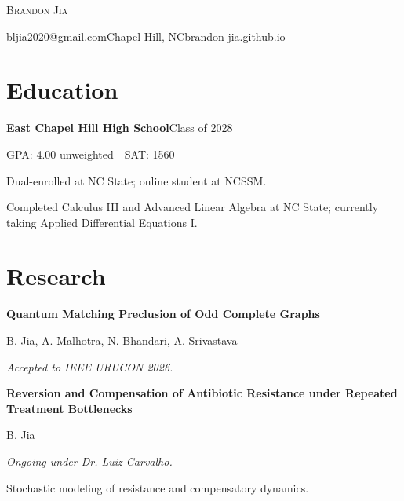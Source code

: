 \documentclass[10pt,letterpaper]{article}
\begin{document}
{\LARGE\scshape Brandon Jia}\par
\vspace{2pt}
\href{mailto:bljia2020@gmail.com}{bljia2020@gmail.com}\enspace\textbar\enspace Chapel Hill, NC\enspace\textbar\enspace \href{https://brandon-jia.github.io}{brandon-jia.github.io}

\section*{Education}
\textbf{East Chapel Hill High School}\hfill {\small Class of 2028}\par
GPA: 4.00 unweighted \,\textbar\, SAT: 1560\par
Dual-enrolled at NC State; online student at NCSSM.\par
Completed Calculus III and Advanced Linear Algebra at NC State; currently taking Applied Differential Equations I.\par
\vspace{3pt}
\section*{Research}
\textbf{Quantum Matching Preclusion of Odd Complete Graphs}\par
{\small B. Jia, A. Malhotra, N. Bhandari, A. Srivastava}\par
\textit{Accepted to IEEE URUCON 2026.}\par
\vspace{3pt}
\textbf{Reversion and Compensation of Antibiotic Resistance under Repeated Treatment Bottlenecks}\par
{\small B. Jia}\par
\textit{Ongoing under Dr. Luiz Carvalho.}\par
Stochastic modeling of resistance and compensatory dynamics.\par
\vspace{3pt}
\end{document}
